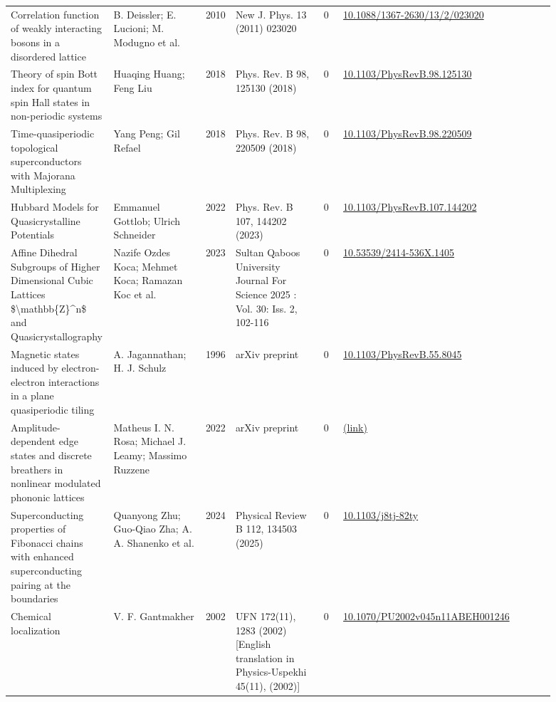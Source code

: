 \documentclass[10pt,a4paper]{article}
\begin{document}
{\begin{longtable}{p{0.192\linewidth}p{0.192\linewidth}p{0.043\linewidth}p{0.192\linewidth}p{0.043\linewidth}p{0.132\linewidth}p{0.096\linewidth}}
Correlation function of weakly interacting bosons in a disordered lattice & B. Deissler; E. Lucioni; M. Modugno et al. & 2010 & New J. Phys. 13 (2011) 023020 & 0 & \href{https://doi.org/10.1088/1367-2630/13/2/023020}{10.1088/1367-2630/13/2/023020} &  \\
Theory of spin Bott index for quantum spin Hall states in non-periodic systems & Huaqing Huang; Feng Liu & 2018 & Phys. Rev. B 98, 125130 (2018) & 0 & \href{https://doi.org/10.1103/PhysRevB.98.125130}{10.1103/PhysRevB.98.125130} &  \\
Time-quasiperiodic topological superconductors with Majorana Multiplexing & Yang Peng; Gil Refael & 2018 & Phys. Rev. B 98, 220509 (2018) & 0 & \href{https://doi.org/10.1103/PhysRevB.98.220509}{10.1103/PhysRevB.98.220509} &  \\
Hubbard Models for Quasicrystalline Potentials & Emmanuel Gottlob; Ulrich Schneider & 2022 & Phys. Rev. B 107, 144202 (2023) & 0 & \href{https://doi.org/10.1103/PhysRevB.107.144202}{10.1103/PhysRevB.107.144202} &  \\
Affine Dihedral Subgroups of Higher Dimensional Cubic Lattices \$\textbackslash{}mathbb\{Z\}\^{}n\$ and Quasicrystallography & Nazife Ozdes Koca; Mehmet Koca; Ramazan Koc et al. & 2023 & Sultan Qaboos University Journal For Science 2025 : Vol. 30: Iss. 2, 102-116 & 0 & \href{https://doi.org/10.53539/2414-536X.1405}{10.53539/2414-536X.1405} &  \\
Magnetic states induced by electron-electron interactions in a plane quasiperiodic tiling & A. Jagannathan; H. J. Schulz & 1996 & arXiv preprint & 0 & \href{https://doi.org/10.1103/PhysRevB.55.8045}{10.1103/PhysRevB.55.8045} &  \\
Amplitude-dependent edge states and discrete breathers in nonlinear modulated phononic lattices & Matheus I. N. Rosa; Michael J. Leamy; Massimo Ruzzene & 2022 & arXiv preprint & 0 & \href{http://arxiv.org/abs/2201.05526v2}{(link)} &  \\
Superconducting properties of Fibonacci chains with enhanced superconducting pairing at the boundaries & Quanyong Zhu; Guo-Qiao Zha; A. A. Shanenko et al. & 2024 & Physical Review B 112, 134503 (2025) & 0 & \href{https://doi.org/10.1103/j8tj-82ty}{10.1103/j8tj-82ty} &  \\
Chemical localization & V. F. Gantmakher & 2002 & UFN 172(11), 1283 (2002) {[}English translation in Physics-Uspekhi 45(11), (2002){]} & 0 & \href{https://doi.org/10.1070/PU2002v045n11ABEH001246}{10.1070/PU2002v045n11ABEH001246} &  \\

\end{longtable}}
\end{document}
